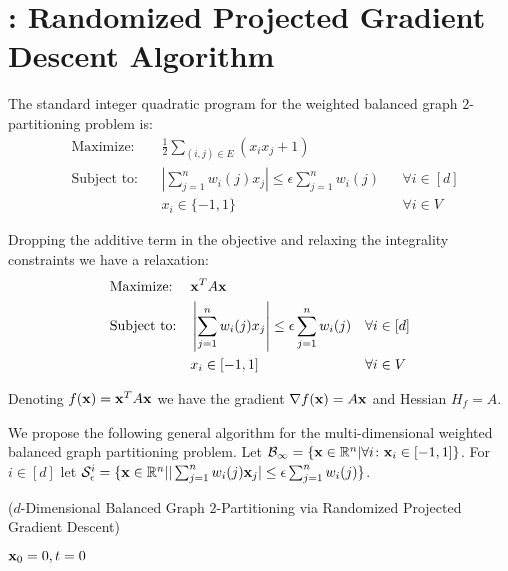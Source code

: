 \section{\algname: Randomized Projected Gradient Descent Algorithm}\label{sec:algorithm}

The standard integer quadratic program for the weighted balanced graph $2$-partitioning problem is:
\begin{align*}
&\text{Maximize:  }  && \frac12  \sum_{(i, j) \in E} (x_i x_j + 1) && \\
&\text{Subject to:} && \left|\sum_{j = 1}^n w_i(j) x_j\right| \le \epsilon \sum_{j = 1}^n w_i(j)  && \forall i \in [d]\\
&&& x_i \in \{-1,1\} && \forall i \in V
\end{align*}

Dropping the additive term in the objective and relaxing the integrality constraints we have a relaxation:
\begin{align*}
&\text{Maximize:}  && \mathbf x^T A \mathbf x && \\
&\text{Subject to:} && \left|\sum_{j = 1}^n w_i(j) x_j\right| \le \epsilon \sum_{j = 1}^n w_i(j)  && \forall i \in [d]\\
&&& x_i \in [-1,1] && \forall i \in V
\end{align*}

Denoting $f(\mathbf x) = \mathbf x^T A \mathbf x$ we have the gradient $\nabla f(\mathbf x) = A \mathbf x$ and Hessian $H_f = A$.

We propose the following general algorithm for the multi-dimensional weighted balanced graph partitioning problem.
Let $\mathcal B_\infty = \{\mathbf x \in \mathbb R^n | \forall i \colon \mathbf x_i \in [-1,1]\}$.
For $i \in [d]$ let $\mathcal S^i_\epsilon = \{\mathbf x \in \mathbb R^n  | |\sum_{j = 1}^n w_i(j) \mathbf x_j | \le \epsilon \sum_{j = 1}^n w_i(j)\}$.

\begin{algorithm}[H]\label{alg:mdgp-rpgd}
	\caption{\algname ($d$-Dimensional Balanced Graph $2$-Partitioning via Randomized Projected Gradient Descent)}\label{alg:main}
	$\mathbf x_0 = 0, t = 0$ \\	
\end{algorithm}